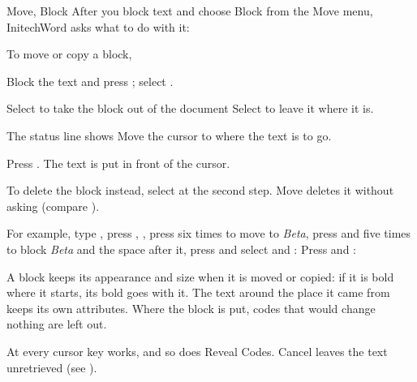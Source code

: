 \begin{Feature}{Move, Block}
After you block text and choose Block from the Move menu, InitechWord asks
what to do with it:

To move or copy a block,
\begin{WPSteps}
\item Block the text and press ; select .
\item Select  to take the block out of the document
\Or
Select  to leave it where it is.
\item The status line shows 
Move the cursor to where the text is to go.
\item Press .  The text is put in front of the cursor.
\end{WPSteps}
To delete the block instead, select  at the second step.
Move deletes it without asking (compare ).

For example, type , press ,
, press  six times to move to \textit{Beta},
press  and  five times to block
\textit{Beta} and the space after it, press
 and select  and :
Press  and :
\EndReplay

\Notes
{}
A block keeps its appearance and size when it is moved or copied: if it is
bold where it starts, its bold goes with it.  The text around the place it
came from keeps its own attributes.  Where the block is put, codes that
would change nothing are left out.

At  every cursor key works, and
so does Reveal Codes.  Cancel leaves the text unretrieved (see
).

\end{Feature}

